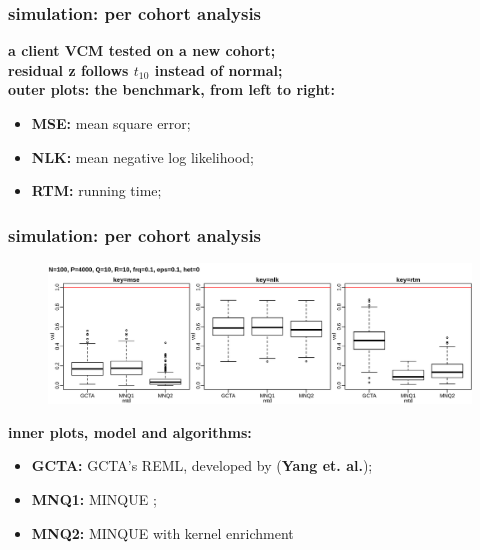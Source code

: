 \documentclass{beamer}
\begin{document}
\begin{frame}\frametitle{simulation: per cohort analysis}
  \textbf{a client VCM tested on a new cohort;} \\
  \textbf{residual z follows $t_{10}$ instead of normal;} \\
  {\color{blue}\textbf{outer plots: the benchmark, from left to right:}}
  \begin{itemize}
  \item \textbf{MSE:} mean square error;
  \item \textbf{NLK:} mean negative log likelihood;
  \item \textbf{RTM:} running time;
  \end{itemize}
\end{frame}
\begin{frame} \frametitle{simulation: per cohort analysis}
  \begin{figure}
    \centering \includegraphics[width=.95\linewidth]{img/vcm_ply_mnq}
  \end{figure}
  {\color{blue}\textbf{inner plots, model and algorithms:}}
  \begin{itemize}
  \item \textbf{GCTA:} GCTA's REML, developed by (\textbf{Yang et. al.});
  \item \textbf{MNQ1:} MINQUE ;
  \item \textbf{MNQ2:} MINQUE with kernel enrichment
  \end{itemize}
\end{frame}
\end{document}
